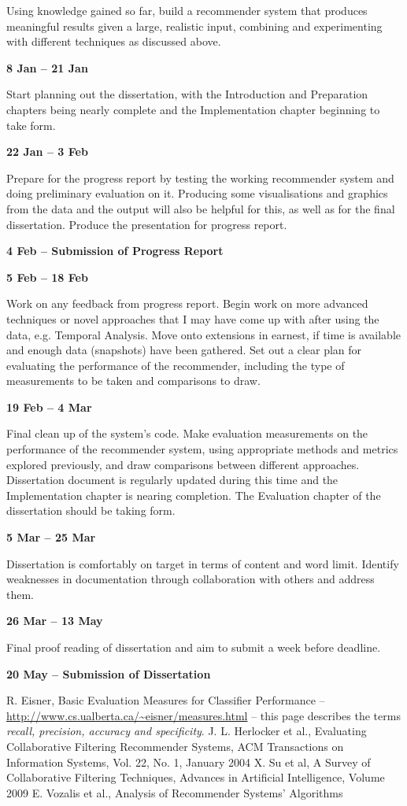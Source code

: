 Using knowledge gained so far, build a recommender system that produces meaningful results given a large, realistic input, combining and experimenting with different techniques as discussed above.

\textbf{8 Jan -- 21 Jan}

Start planning out the dissertation, with the Introduction and Preparation chapters being nearly complete and the Implementation chapter beginning to take form.

\textbf{22 Jan -- 3 Feb}

Prepare for the progress report by testing the working recommender system and doing preliminary evaluation on it. Producing some visualisations and graphics from the data and the output will also be helpful for this, as well as for the final dissertation. 
Produce the presentation for progress report.

\textbf{4 Feb -- Submission of Progress Report}

\textbf{5 Feb -- 18 Feb}

Work on any feedback from progress report.
Begin work on more advanced techniques or novel approaches that I may have come up with after using the data, e.g. Temporal Analysis. Move onto extensions in earnest, if time is available and enough data (snapshots) have been gathered.
Set out a clear plan for evaluating the performance of the recommender, including the type of measurements to be taken and comparisons to draw.

\textbf{19 Feb -- 4 Mar}

Final clean up of the system's code.
Make evaluation measurements on the performance of the recommender system, using appropriate methods and metrics explored previously, and draw comparisons between different approaches.
Dissertation document is regularly updated during this time and the Implementation chapter is nearing completion.
The Evaluation chapter of the dissertation should be taking form.

\textbf{5 Mar -- 25 Mar}

Dissertation is comfortably on target in terms of content and word limit.
Identify weaknesses in documentation through collaboration with others and address them.

\textbf{26 Mar -- 13 May}

Final proof reading of dissertation and aim to submit a week before deadline.

\textbf{20 May -- Submission of Dissertation}


\begin{thebibliography}{}
  R. Eisner, Basic Evaluation Measures for Classifier Performance -- \url{http://www.cs.ualberta.ca/~eisner/measures.html} -- this page describes the terms \textit{recall, precision, accuracy and specificity}.
  J. L. Herlocker et al., Evaluating Collaborative Filtering Recommender Systems, ACM Transactions on Information Systems, Vol. 22, No. 1, January 2004
  X. Su et al, A Survey of Collaborative Filtering Techniques, Advances in Artificial Intelligence, Volume 2009
  E. Vozalis et al., Analysis of Recommender Systems' Algorithms
\end{thebibliography}
